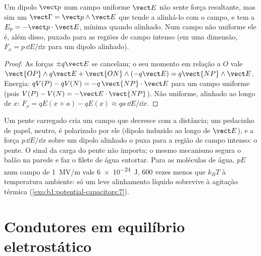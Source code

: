 \begin{proposition}\label{prop:b1:potential-capacitors:dipoleinfield}
Um dipolo $\vect p$ num campo uniforme $\vect E$ não sente força resultante, mas
sim um  $\vect\Gamma = \vect p\wedge\vect E$ que tende a alinhá-lo com
o campo, e tem a  $E_p = -\vect p\cdot\vect E$,
mínima quando alinhado. Num campo não uniforme ele é, além disso, puxado
para as regiões de campo intenso (em uma dimensão, $F_x = p\,\dd E/\dd x$
para um dipolo alinhado).
\end{proposition}

\begin{proof}
As forças $\pm q\vect E$ se cancelam; o seu momento em relação a $O$ vale $\vect{OP}\wedge
q\vect E + \vect{ON}\wedge(-q\vect E) = q\vect{NP}\wedge\vect E$. Energia:
$qV(P) - qV(N) = -q\,\vect{NP}\cdot\vect E$ para um campo uniforme (pois $V(P)
- V(N) = -\vect E\cdot\vect{NP}$). Não uniforme, alinhado ao longo de $x$: $F_x =
qE(x + a) - qE(x) \approx qa\,\dd E/\dd x$.
\end{proof}

\begin{example}\label{ex:b1:potential-capacitors:comb}
Um pente carregado cria um campo que decresce com a distância; um pedacinho de
papel, neutro, é polarizado por ele (dipolo induzido ao longo de $\vect E$), e
a força $p\,\dd E/\dd x$ sobre um dipolo alinhado o puxa para a
região de campo intenso: o pente. O sinal da carga do pente não importa;
o mesmo mecanismo segura o balão na parede e faz o filete de
água entortar. Para as moléculas de água, $pE$ num campo de \qty{1}{MV/m}
vale \qty{6e-24}{J}, $600$ vezes menos que $k_BT$ à temperatura ambiente:
só um leve alinhamento líquido sobrevive à agitação térmica
(\cref{exo:b1:potential-capacitors:7}).
\end{example}

\section{Condutores em equilíbrio eletrostático}


